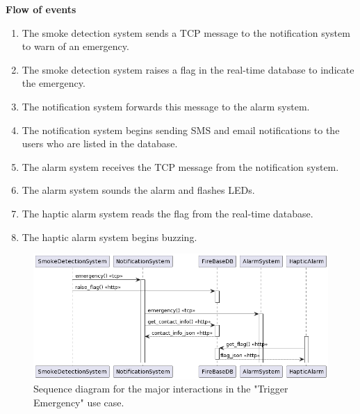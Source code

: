 \textbf{Flow of events}
\begin{enumerate}
    \item The smoke detection system sends a TCP message to the notification system to warn of an emergency.
    \item The smoke detection system raises a flag in the real-time database to indicate the emergency.
    \item The notification system forwards this message to the alarm system.
    \item The notification system begins sending SMS and email notifications to the users who are listed in the database.
    \item The alarm system receives the TCP message from the notification system.
    \item The alarm system sounds the alarm and flashes LEDs.
    \item The haptic alarm system reads the flag from the real-time database.
    \item The haptic alarm system begins buzzing.
\end{enumerate}

\begin{figure}[H]
    \centering
    \includegraphics[width=\linewidth]{../assets/FANSAlarmUseCaseSequence.png}
    \caption{Sequence diagram for the major interactions in the "Trigger Emergency" use case.}
\end{figure}
